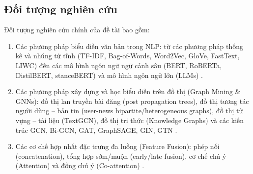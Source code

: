\documentclass[11pt,a4paper]{extreport}
\begin{document}
\subsection{Đối tượng nghiên cứu}
Đối tượng nghiên cứu chính của đề tài bao gồm:
\begin{enumerate}
    \item Các phương pháp biểu diễn văn bản trong NLP: từ các phương pháp thống kê và nhúng từ tĩnh (TF-IDF, Bag-of-Words, Word2Vec, GloVe, FastText, LIWC) đến các mô hình ngôn ngữ ngữ cảnh sâu (BERT, RoBERTa, DistilBERT, stanceBERT) và mô hình ngôn ngữ lớn (LLMs) \cite{noauthor_disinformation_2024, noauthor_exploiting_2024, noauthor_hybrid_2025}.
    \item Các phương pháp xây dựng và học biểu diễn trên đồ thị (Graph Mining \& GNNs): đồ thị lan truyền bài đăng (post propagation trees), đồ thị tương tác người dùng -- bản tin (user-news bipartite/heterogeneous graphs), đồ thị từ vựng -- tài liệu (TextGCN), đồ thị tri thức (Knowledge Graphs) và các kiến trúc GCN, Bi-GCN, GAT, GraphSAGE, GIN, GTN \cite{noauthor_fake_2023, noauthor_disinformation_2024, noauthor_co-attention_2025}.
    \item Các cơ chế hợp nhất đặc trưng đa luồng (Feature Fusion): phép nối (concatenation), tổng hợp sớm/muộn (early/late fusion), cơ chế chú ý (Attention) và đồng chú ý (Co-attention) \cite{noauthor_dual_2025, cui_graph_2025, noauthor_co-attention_2025}.
\end{enumerate}
\end{document}
